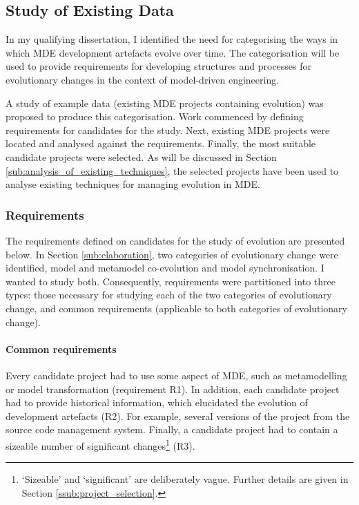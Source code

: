 \subsection{Study of Existing Data}
In my qualifying dissertation, I identified the need for categorising the ways in which MDE development artefacts evolve over time. The categorisation will be used to provide requirements for developing structures and processes for evolutionary changes in the context of model-driven engineering.

A study of example data (existing MDE projects containing evolution) was proposed to produce this categorisation. Work commenced by defining requirements for candidates for the study. Next, existing MDE projects were located and analysed against the requirements. Finally, the most suitable candidate projects were selected. As will be discussed in Section \ref{sub:analysis_of_existing_techniques}, the selected projects have been used to analyse existing techniques for managing evolution in MDE.

\subsubsection{Requirements} %
\label{ssub:requirements}
The requirements defined on candidates for the study of evolution are presented below. In Section \ref{sub:elaboration}, two categories of evolutionary change were identified, model and metamodel co-evolution and model synchronisation. I wanted to study both. Consequently, requirements were partitioned into three types: those necessary for studying each of the two categories of evolutionary change, and common requirements (applicable to both categories of evolutionary change).

\paragraph{Common requirements}
Every candidate project had to use some aspect of MDE, such as metamodelling or model transformation (requirement R1). In addition, each candidate project had to provide historical information, which elucidated the evolution of development artefacts (R2). For example, several versions of the project from the source code management system. Finally, a candidate project had to contain a sizeable number of significant changes\footnote{`Sizeable' and `significant' are deliberately vague. Further details are given in Section \ref{ssub:project_selection}.} (R3).

